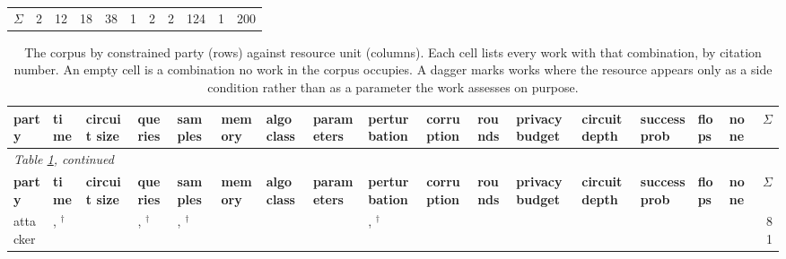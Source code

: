 \begin{landscape}
\begin{longtable}{lp{2.10cm}p{2.10cm}p{2.10cm}p{2.10cm}p{2.10cm}p{2.10cm}p{2.10cm}p{2.10cm}p{2.10cm}r}
\midrule
$\Sigma$ & 2 & 12 & 18 & 38 & 1 & 2 & 2 & 124 & 1 & 200 \\
\end{longtable}
\endgroup
\end{landscape}

\begin{landscape}
\begingroup\scriptsize\setlength{\tabcolsep}{3pt}
\begin{longtable}{lp{1.70cm}p{1.70cm}p{1.70cm}p{1.70cm}p{1.70cm}p{1.70cm}p{1.70cm}p{1.70cm}p{1.70cm}p{1.70cm}p{1.70cm}p{1.70cm}p{1.70cm}p{1.70cm}p{1.70cm}r}
\caption{The corpus by constrained party (rows) against resource unit (columns). Each cell lists every work with that combination, by citation number. An empty cell is a combination no work in the corpus occupies. A dagger marks works where the resource appears only as a side condition rather than as a parameter the work assesses on purpose.}\label{tab:party-unit}\\
\toprule \textbf{party} & \textbf{time} & \textbf{circuit size} & \textbf{queries} & \textbf{samples} & \textbf{memory} & \textbf{algo class} & \textbf{parameters} & \textbf{perturbation} & \textbf{corruption} & \textbf{rounds} & \textbf{privacy budget} & \textbf{circuit depth} & \textbf{success prob} & \textbf{flops} & \textbf{none} & \textbf{$\Sigma$} \\ \midrule\endfirsthead
\multicolumn{17}{l}{\emph{Table \ref{tab:party-unit}, continued}}\\
\toprule \textbf{party} & \textbf{time} & \textbf{circuit size} & \textbf{queries} & \textbf{samples} & \textbf{memory} & \textbf{algo class} & \textbf{parameters} & \textbf{perturbation} & \textbf{corruption} & \textbf{rounds} & \textbf{privacy budget} & \textbf{circuit depth} & \textbf{success prob} & \textbf{flops} & \textbf{none} & \textbf{$\Sigma$} \\ \midrule\endhead
\bottomrule\endfoot
attacker & \cite{AHY25,BCS24,BGHKP24,BRSV17,CGH04,CK21,CKMMNST25,DJYWWMNL26,DKLP22,DN03,EMM20,GIKKM23,GKY11,HMST22,HMSTY25,JYCDTCP21,LLW19,MPRV09,MR26,Son24,VDKMR26,XSD24}, \cite{BDJV22,CCNSTT22,FJTYCDCP23,SSZHTE24,ZCSL24,ZFWCSXZ26}$^\dagger$ & \cite{ABIKN23,BC22,BJRZ24,BW08,GHJS25,GJMM20} & \cite{ACMS23,BM09,CCGJY20,CGZ24,HU14,ML24}, \cite{CCHRSS24,CJM20,FK24,NCM25,SSSS17}$^\dagger$ & \cite{HSU25}, \cite{SE22}$^\dagger$ & \cite{BCEQ24,DQW22,DQW23,GZ19} & \cite{CIM19,DVV16,JCBKP20,WSPX24} &  & \cite{ACW18,APU25,CASDFCMH21,CRK19,CYDS26,DMM20,FFF18,HDDH26,LAGHJ19,Mah19,PSV23,SLDLN25,SSTTM18,SWKBC25,SYLZZRB19,TCBM20,TSETM19,WK18}, \cite{CAPBRTGMK19,CGBSHC22}$^\dagger$ & \cite{LCMER25,LXSWLGZX25,MMM19,RT24,SKL17} &  &  & \cite{GM24} &  &  &  & 81 \\

\end{longtable}
\end{landscape}
